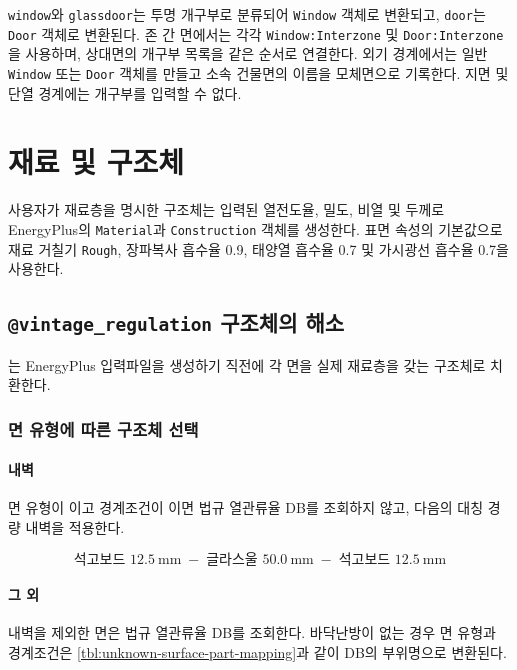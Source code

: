 \texttt{window}와 \texttt{glassdoor}는 투명 개구부로 분류되어 \texttt{Window} 객체로 변환되고, \texttt{door}는 \texttt{Door} 객체로 변환된다. 존 간 면에서는 각각 \texttt{Window:Interzone} 및 \texttt{Door:Interzone}을 사용하며, 상대면의 개구부 목록을 같은 순서로 연결한다. 외기 경계에서는 일반 \texttt{Window} 또는 \texttt{Door} 객체를 만들고 소속 건물면의 이름을 모체면으로 기록한다. 지면 및 단열 경계에는 개구부를 입력할 수 없다.

\section{재료 및 구조체}

사용자가 재료층을 명시한 구조체는 입력된 열전도율, 밀도, 비열 및 두께로 EnergyPlus의 \texttt{Material}과 \texttt{Construction} 객체를 생성한다. 표면 속성의 기본값으로 재료 거칠기 \texttt{Rough}, 장파복사 흡수율 0.9, 태양열 흡수율 0.7 및 가시광선 흡수율 0.7을 사용한다.

\subsection{\texttt{@vintage\_regulation} 구조체의 해소}

\simulator 는 EnergyPlus 입력파일을 생성하기 직전에 각  면을 실제 재료층을 갖는 구조체로 치환한다.

\subsubsection{면 유형에 따른 구조체 선택}

\paragraph{내벽}
면 유형이 이고 경계조건이 이면 법규
열관류율 DB를 조회하지 않고, 다음의 대칭 경량 내벽을 적용한다.

\[
  \text{석고보드 }12.5\ \mathrm{mm}
  \;-\;
  \text{글라스울 }50.0\ \mathrm{mm}
  \;-\;
  \text{석고보드 }12.5\ \mathrm{mm}
\]

\paragraph{그 외}
내벽을 제외한  면은 법규 열관류율 DB를 조회한다. 바닥난방이 없는 경우 면 유형과 경계조건은 \cref{tbl:unknown-surface-part-mapping}과 같이 DB의 부위명으로 변환된다.

